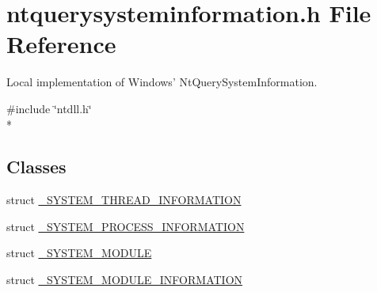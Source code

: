 \section{ntquerysysteminformation.\-h File Reference}
\label{ntquerysysteminformation_8h}


Local implementation of Windows' Nt\-Query\-System\-Information.  


{\ttfamily \#include \char`\"{}ntdll.\-h\char`\"{}}\\*
\subsection*{Classes}
\begin{DoxyCompactItemize}
\item 
struct \hyperlink{struct___s_y_s_t_e_m___t_h_r_e_a_d___i_n_f_o_r_m_a_t_i_o_n}{\-\_\-\-S\-Y\-S\-T\-E\-M\-\_\-\-T\-H\-R\-E\-A\-D\-\_\-\-I\-N\-F\-O\-R\-M\-A\-T\-I\-O\-N}
\item 
struct \hyperlink{struct___s_y_s_t_e_m___p_r_o_c_e_s_s___i_n_f_o_r_m_a_t_i_o_n}{\-\_\-\-S\-Y\-S\-T\-E\-M\-\_\-\-P\-R\-O\-C\-E\-S\-S\-\_\-\-I\-N\-F\-O\-R\-M\-A\-T\-I\-O\-N}
\item 
struct \hyperlink{struct___s_y_s_t_e_m___m_o_d_u_l_e}{\-\_\-\-S\-Y\-S\-T\-E\-M\-\_\-\-M\-O\-D\-U\-L\-E}
\item 
struct \hyperlink{struct___s_y_s_t_e_m___m_o_d_u_l_e___i_n_f_o_r_m_a_t_i_o_n}{\-\_\-\-S\-Y\-S\-T\-E\-M\-\_\-\-M\-O\-D\-U\-L\-E\-\_\-\-I\-N\-F\-O\-R\-M\-A\-T\-I\-O\-N}
\end{DoxyCompactItemize}
